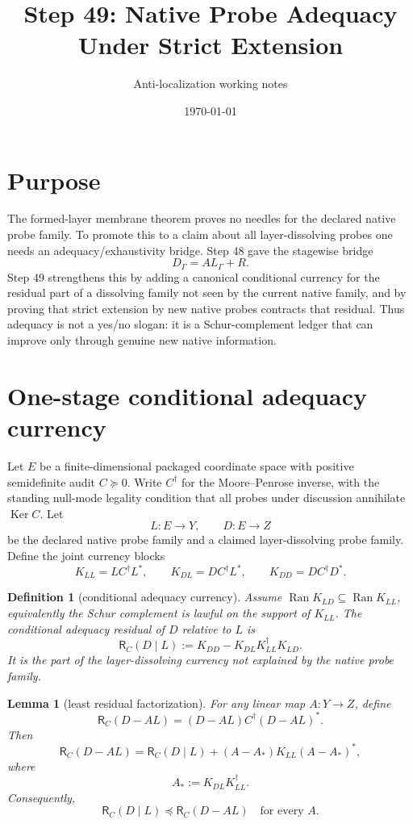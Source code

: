 \documentclass[11pt]{article}
\title{Step 49: Native Probe Adequacy Under Strict Extension}
\author{Anti-localization working notes}
\date{\today}
\newtheorem{lemma}[theorem]{Lemma}
\newtheorem{definition}[theorem]{Definition}
\newcommand{\R}{\mathsf R}
\newcommand{\Ran}{\operatorname{Ran}}
\newcommand{\Ker}{\operatorname{Ker}}
\newcommand{\Loewner}{\preceq}
\begin{document}
\maketitle

\section{Purpose}
The formed-layer membrane theorem proves no needles for the declared native probe family.  To promote this to a claim about all layer-dissolving probes one needs an adequacy/exhaustivity bridge.  Step 48 gave the stagewise bridge
\[
        D_\Gamma = A L_\Gamma + R .
\]
Step 49 strengthens this by adding a canonical conditional currency for the residual part of a dissolving family not seen by the current native family, and by proving that strict extension by new native probes contracts that residual.  Thus adequacy is not a yes/no slogan: it is a Schur-complement ledger that can improve only through genuine new native information.

\section{One-stage conditional adequacy currency}
Let $E$ be a finite-dimensional packaged coordinate space with positive semidefinite audit $C\succeq0$.  Write $C^\dagger$ for the Moore--Penrose inverse, with the standing null-mode legality condition that all probes under discussion annihilate $\Ker C$.
Let
\[
        L:E\to Y,\qquad D:E\to Z
\]
be the declared native probe family and a claimed layer-dissolving probe family.  Define the joint currency blocks
\[
K_{LL}=LC^\dagger L^*,\qquad
K_{DL}=DC^\dagger L^*,\qquad
K_{DD}=DC^\dagger D^*.
\]

\begin{definition}[conditional adequacy currency]
Assume $\Ran K_{LD}\subseteq \Ran K_{LL}$, equivalently the Schur complement is lawful on the support of $K_{LL}$.  The conditional adequacy residual of $D$ relative to $L$ is
\[
        \boxed{
        \R_C(D\mid L)
        := K_{DD}-K_{DL}K_{LL}^\dagger K_{LD}.
        }
\]
It is the part of the layer-dissolving currency not explained by the native probe family.
\end{definition}

\begin{lemma}[least residual factorization]
For any linear map $A:Y\to Z$, define
\[
        \R_C(D-AL)=(D-AL)C^\dagger(D-AL)^*.
\]
Then
\[
        \R_C(D-AL)
        =\R_C(D\mid L)
        +(A-A_*)K_{LL}(A-A_*)^*,
\]
where
\[
        A_*:=K_{DL}K_{LL}^\dagger.
\]
Consequently,
\[
        \boxed{\R_C(D\mid L)\Loewner \R_C(D-AL)\quad\text{for every }A.}
\]
\end{lemma}
\end{document}
